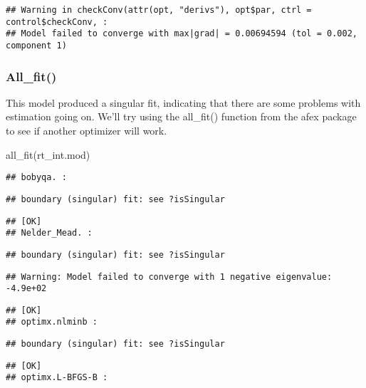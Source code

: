 \documentclass[
]{article}
\newenvironment{Shaded}{\begin{snugshade}}{\end{snugshade}}
\newcommand{\FunctionTok}[1]{\textcolor[rgb]{0.00,0.00,0.00}{#1}}
\newcommand{\NormalTok}[1]{#1}
\begin{document}
\begin{verbatim}
## Warning in checkConv(attr(opt, "derivs"), opt$par, ctrl = control$checkConv, :
## Model failed to converge with max|grad| = 0.00694594 (tol = 0.002, component 1)
\end{verbatim}

\hypertarget{all_fit-1}{%
\subsubsection{All\_fit()}\label{all_fit-1}}

This model produced a singular fit, indicating that there are some
problems with estimation going on. We'll try using the all\_fit()
function from the afex package to see if another optimizer will work.

\begin{Shaded}
\begin{Highlighting}[]
\FunctionTok{all\_fit}\NormalTok{(rt\_int.mod)}
\end{Highlighting}
\end{Shaded}

\begin{verbatim}
## bobyqa. :
\end{verbatim}

\begin{verbatim}
## boundary (singular) fit: see ?isSingular
\end{verbatim}

\begin{verbatim}
## [OK]
## Nelder_Mead. :
\end{verbatim}

\begin{verbatim}
## boundary (singular) fit: see ?isSingular
\end{verbatim}

\begin{verbatim}
## Warning: Model failed to converge with 1 negative eigenvalue: -4.9e+02
\end{verbatim}

\begin{verbatim}
## [OK]
## optimx.nlminb :
\end{verbatim}

\begin{verbatim}
## boundary (singular) fit: see ?isSingular
\end{verbatim}

\begin{verbatim}
## [OK]
## optimx.L-BFGS-B :
\end{verbatim}
\end{document}
